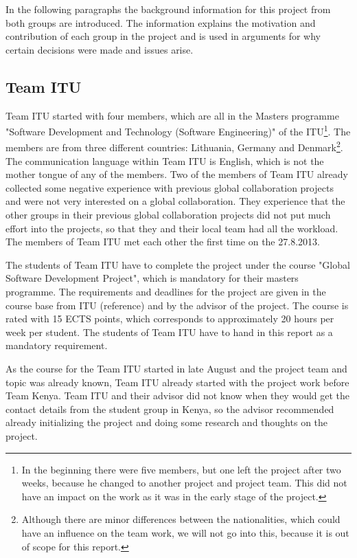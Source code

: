 In the following paragraphs the background information for this project from both groups are introduced. The information explains the motivation and contribution of each group in the project and is used in arguments for why certain decisions were made and issues arise.


\subsection{Team ITU}
Team ITU started with four members, which are all in the Masters programme "Software Development and Technology (Software Engineering)" of the ITU\footnote{In the beginning there were five members, but one left the project after two weeks, because he changed to another project and project team. This did not have an impact on the work as it was in the early stage of the project.}. The members are from three different countries: Lithuania, Germany and Denmark\footnote{Although there are minor differences between the nationalities, which could have an influence on the team work, we will not go into this, because it is out of scope for this report.}. The communication language within Team ITU is English, which is not the mother tongue of any of the members. Two of the members of Team ITU already collected some negative experience with previous global collaboration projects and were not very interested on a global collaboration. They experience that the other groups in their previous global collaboration projects did not put much effort into the projects, so that they and their local team had all the workload. The members of Team ITU met each other the first time on the 27.8.2013.

The students of Team ITU have to complete the project under the course "Global Software Development Project", which is mandatory for their masters programme. The requirements and deadlines for the project are given in the course base from ITU (reference) and by the advisor of the project. The course is rated with 15 ECTS points, which corresponds to approximately 20 hours per week per student. The students of Team ITU have to hand in this report as a mandatory requirement.

As the course for the Team ITU started in late August and the project team and topic was already known, Team ITU already started with the project work before Team Kenya. Team ITU and their advisor did not know when they would get the contact details from the student group in Kenya, so the advisor recommended already initializing the project and doing some research and thoughts on the project.

